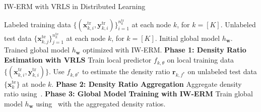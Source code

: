 \begin{algorithm}[t!]
\caption{IW-ERM with VRLS in Distributed Learning}
\label{alg:IWERM_detail}
\footnotesize
\begin{algorithmic}[1]
    \Require Labeled training data $\{(\boldsymbol{x}_{k,i}^{\text{tr}}, \boldsymbol{y}_{k,i}^{\text{tr}})\}_{i=1}^{n_k^{\text{tr}}}$ at each node $k$, for $k = [K]$.
    \Require Unlabeled test data $\{\boldsymbol{x}_{k,j}^{\text{te}}\}_{j=1}^{n_k^{\text{te}}}$ at each node $k$, for $k = [K]$.
    \Require Initial global model $h_{\boldsymbol{w}}$.
    \Ensure Trained global model $h_{\boldsymbol{w}}$ optimized with IW-ERM.
    \State \textbf{Phase 1: Density Ratio Estimation with VRLS}
        \State Train local predictor $f_{k, {\theta}}$ on local training data $\{(\boldsymbol{x}_{k,i}^{\text{tr}}, \boldsymbol{y}_{k,i}^{\text{tr}})\}$.
        \State Use $f_{k, {\theta}^{*}}$ to estimate the density ratio \( {\boldsymbol{r}}_{k, f^{*}} \) on unlabeled test data $\{\boldsymbol{x}_{k}^{\text{te}}\}$ at node $k$.
    \EndFor
    \State \textbf{Phase 2: Density Ratio Aggregation}
            \State Aggregate density ratio  using~.
    \EndFor
    \State \textbf{Phase 3: Global Model Training with IW-ERM}
    \State Train global model $h_{\boldsymbol{w}}$ using~ with the aggregated density ratios.
\end{algorithmic}
\end{algorithm}

